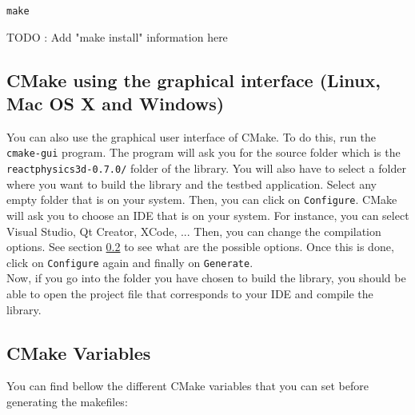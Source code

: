 \documentclass[a4paper,12pt]{article}
\begin{document}
    \texttt{make}

    TODO : Add "make install" information here

    \subsection{CMake using the graphical interface (Linux, Mac OS X and Windows)}

     You can also use the graphical user interface of CMake. To do this,
     run the \texttt{cmake-gui} program. The program will ask you for the
     source folder which is the \texttt{reactphysics3d-0.7.0/} folder of
     the library. You will also have to select a folder where you want to
     build the library and the testbed application. Select any empty folder that
     is on your system. Then, you can click on \texttt{Configure}. CMake will ask you to choose an IDE that is on
     your system. For instance, you can select Visual Studio, Qt Creator, XCode, ... Then, you
     can change the compilation options. See section \ref{sec:cmakevariables} to see what are the possible options.
     Once this is done, click on \texttt{Configure} again and finally on \texttt{Generate}. \\

     Now, if you go into the folder you have chosen to build the
     library, you should be able to open the project file that corresponds to your IDE and compile
     the library. \\

     \subsection{CMake Variables}
     \label{sec:cmakevariables}

     You can find bellow the different CMake variables that you can set before generating the makefiles:
\end{document}
